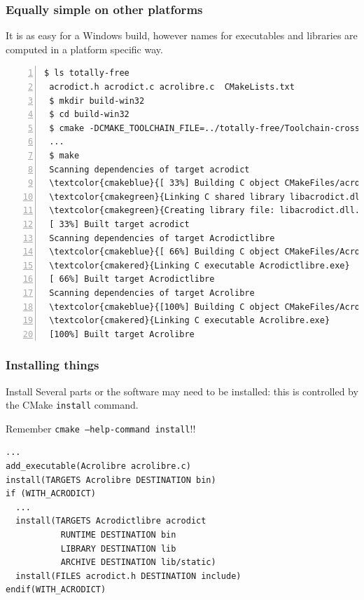 \documentclass[compress,slidestop,table,usepdftitle=false
              ]
               {beamer}
\newcommand{\fname}[1]{\texttt{#1}}
\begin{document}
\begin{frame}[fragile]
\frametitle{Equally simple on other platforms}
It is as easy for a Windows build, however
names for executables and libraries are computed
in a
\textcolor{cmakeblue}{platform}
\textcolor{cmakered}{specific}
\textcolor{cmakegreen}{way}.
\begin{center}
\begin{Verbatim}[commandchars=\\\{\},fontsize=\tiny,numbers=left,frame=topline,label=CMake + MinGW Makefile]
 $ ls totally-free
 acrodict.h acrodict.c acrolibre.c  CMakeLists.txt
 $ mkdir build-win32
 $ cd build-win32
 $ cmake -DCMAKE_TOOLCHAIN_FILE=../totally-free/Toolchain-cross-linux.cmake ../totally-free
 ...
 $ make
 Scanning dependencies of target acrodict
 \textcolor{cmakeblue}{[ 33%] Building C object CMakeFiles/acrodict.dir/acrodict.c.obj}
 \textcolor{cmakegreen}{Linking C shared library libacrodict.dll}
 \textcolor{cmakegreen}{Creating library file: libacrodict.dll.a}
 [ 33%] Built target acrodict
 Scanning dependencies of target Acrodictlibre
 \textcolor{cmakeblue}{[ 66%] Building C object CMakeFiles/Acrodictlibre.dir/acrolibre.c.obj}
 \textcolor{cmakered}{Linking C executable Acrodictlibre.exe}
 [ 66%] Built target Acrodictlibre
 Scanning dependencies of target Acrolibre
 \textcolor{cmakeblue}{[100%] Building C object CMakeFiles/Acrolibre.dir/acrolibre.c.obj}
 \textcolor{cmakered}{Linking C executable Acrolibre.exe}
 [100%] Built target Acrolibre
\end{Verbatim}
\end{center}
\end{frame}

\begin{frame}[fragile]
\frametitle{Installing things}
\begin{block}{Install}
Several parts or the software may need to be installed:
this is controlled by the CMake \lstinline!install! command.

\alert{Remember \fname{cmake --help-command install}!!}
\end{block}
\begin{lstlisting}[basicstyle=\tiny,caption=install command examples]
...
add_executable(Acrolibre acrolibre.c)
install(TARGETS Acrolibre DESTINATION bin)
if (WITH_ACRODICT)
  ...
  install(TARGETS Acrodictlibre acrodict
           RUNTIME DESTINATION bin
           LIBRARY DESTINATION lib
           ARCHIVE DESTINATION lib/static)
  install(FILES acrodict.h DESTINATION include)
endif(WITH_ACRODICT)
\end{lstlisting}
\end{frame}
\end{document}
